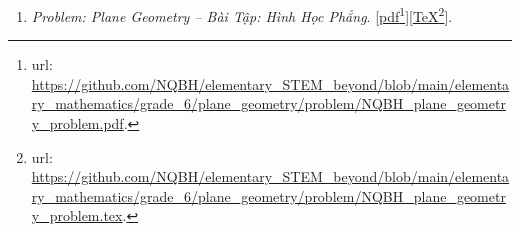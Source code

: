 \documentclass[12pt,oneside]{book}
\newtheorem{baitoan}{Bài toán}
\begin{document}
\begin{enumerate}
	\begin{baitoan}[{\sf Program}: Interchange between fraction \& decimal]
		Viết chương trình {\sf Pascal, Python, C{\tt/}C++} để chuyển đổi giữa số thập phân \& phân số.
	\end{baitoan}
	
	\begin{baitoan}[{\sf Program}: Interchange between ratio \& percentage]
		Viết chương trình {\sf Pascal, Python, C{\tt/}C++} để chuyển đổi giữa tỷ số \& tỷ số $\%$.
	\end{baitoan}
	
	\begin{baitoan}[{\sf Program}: Interchange between base-$d$ systems]
		Viết chương trình {\sf Pascal, Python, C{\tt/}C++} để chuyển đổi giữa 2 hệ cơ số khác nhau.
	\end{baitoan}
	
	\begin{baitoan}[{\sf Program}: Arithmetic sequence]
		Viết chương trình {\sf Pascal, Python, C{\tt/}C++} để in ra cấp số cộng \& tính tổng của cấp số cộng $\{a + bn\}_{n=0}^{+\infty}$ với số hạng đầu $a\in\mathbb{R}$ \& công sai $b\in\mathbb{R}$ nhập từ bàn phím.
	\end{baitoan}
	
	\begin{baitoan}[{\sf Program}: Geometric sequence]
		Viết chương trình {\sf Pascal, Python, C{\tt/}C++} để in ra cấp số nhân \& tính tổng của cấp số nhân $\{aq^n\}_{n=0}^{+\infty}$ với số hạng đầu $a\in\mathbb{R}$ \& công bội $q\in\mathbb{R}$ nhập từ bàn phím.
	\end{baitoan}
	\item {\it Problem: Plane Geometry -- Bài Tập: Hình Học Phẳng}. [\href{https://github.com/NQBH/elementary_STEM_beyond/blob/main/elementary_mathematics/grade_6/plane_geometry/problem/NQBH_plane_geometry_problem.pdf}{pdf}\footnote{{\sc url}: \url{https://github.com/NQBH/elementary_STEM_beyond/blob/main/elementary_mathematics/grade_6/plane_geometry/problem/NQBH_plane_geometry_problem.pdf}.}][\href{https://github.com/NQBH/elementary_STEM_beyond/blob/main/elementary_mathematics/grade_6/plane_geometry/problem/NQBH_plane_geometry_problem.tex}{\TeX}\footnote{{\sc url}: \url{https://github.com/NQBH/elementary_STEM_beyond/blob/main/elementary_mathematics/grade_6/plane_geometry/problem/NQBH_plane_geometry_problem.tex}.}].
	

\end{enumerate}
\end{document}

